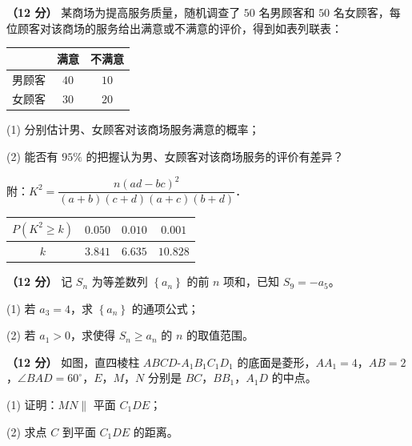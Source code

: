 \begin{question}
\textbf{（12 分）} 某商场为提高服务质量，随机调查了 $50$ 名男顾客和 $50$ 名女顾客，每位顾客对该商场的服务给出满意或不满意的评价，得到如表列联表：

\begin{center}
\begin{tabular}{ccc}
\toprule
 & 满意 & 不满意 \\
\midrule
男顾客 & $40$ & $10$ \\
女顾客 & $30$ & $20$ \\
\bottomrule
\end{tabular}
\end{center}

  (1) 分别估计男、女顾客对该商场服务满意的概率；

  (2) 能否有 $95\%$ 的把握认为男、女顾客对该商场服务的评价有差异？

  附：$K^{2}=\dfrac{n(ad-bc)^{2}}{(a+b)(c+d)(a+c)(b+d)}$．

\begin{center}
\begin{tabular}{cccc}
\toprule
$P\left(K^{2}\ge k\right)$ & $0.050$ & $0.010$ & $0.001$ \\
\midrule
$k$ & $3.841$ & $6.635$ & $10.828$ \\
\bottomrule
\end{tabular}
\end{center}

\end{question}
\begin{question}
\textbf{（12 分）} 记 $S_n$ 为等差数列 $\left\{a_n\right\}$ 的前 $n$ 项和，已知 $S_9=-a_5$。

  (1) 若 $a_3=4$，求 $\left\{a_n\right\}$ 的通项公式；

  (2) 若 $a_1>0$，求使得 $S_n\ge a_n$ 的 $n$ 的取值范围。

\Needspace{0.4\textheight}
\end{question}
\begin{question}
\textbf{（12 分）} 如图，直四棱柱 $ABCD\text{-}A_1B_1C_1D_1$ 的底面是菱形，$AA_1=4$，$AB=2$，$\angle BAD=60^\circ$，$E$，$M$，$N$ 分别是 $BC$，$BB_1$，$A_1D$ 的中点。
\nopagebreak[4]
\begin{center}\end{center}
\nopagebreak[4]
  (1) 证明：$MN\parallel$ 平面 $C_1DE$；

  (2) 求点 $C$ 到平面 $C_1DE$ 的距离。

\end{question}
